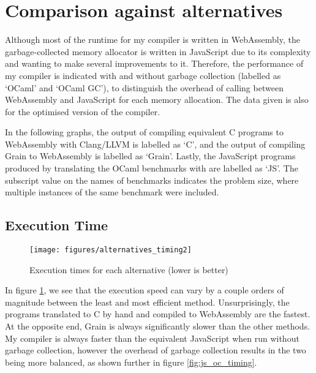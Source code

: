 

\section{Comparison against alternatives}
Although most of the runtime for my compiler is written in WebAssembly, the garbage-collected memory allocator is written in JavaScript due to its complexity and wanting to make several improvements to it. Therefore, the performance of my compiler is indicated with and without garbage collection (labelled as `OCaml' and `OCaml GC'), to distinguish the overhead of calling between WebAssembly and JavaScript for each memory allocation. The data given is also for the optimised version of the compiler.

In the following graphs, the output of compiling equivalent C programs to WebAssembly with Clang/LLVM is labelled as `C', and the output of compiling Grain to WebAssembly is labelled as `Grain'. Lastly, the JavaScript programs produced by translating the OCaml benchmarks with \jsofocaml{} are labelled as `JS'. The subscript value on the names of benchmarks indicates the problem size, where multiple instances of the same benchmark were included.

\subsection{Execution Time}

\begin{figure}[H]
\hspace{-0.7cm}
\texttt{[image: figures/alternatives\_timing2]}
\vspace{-0.5cm}
\caption{Execution times for each alternative (lower is better)}
 \label{fig:alt_timing} 
\end{figure}

In figure \ref{fig:alt_timing}, we see that the execution speed can vary by a couple orders of magnitude between the least and most efficient method. Unsurprisingly, the programs translated to C by hand and compiled to WebAssembly are the fastest. At the opposite end, Grain is always significantly slower than the other methods. My compiler is always faster than the equivalent JavaScript when run without garbage collection, 
however the overhead of garbage collection results in the two being more balanced, as shown further in figure \ref{fig:js_oc_timing}.

